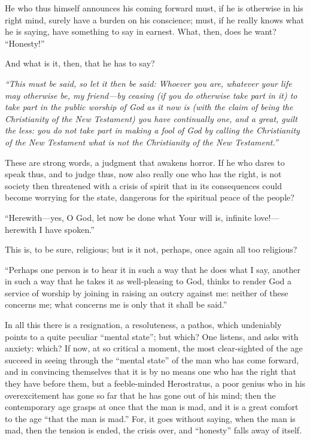 \documentclass[12pt,a4paper]{article}
\newcommand{\opage}[1]{\marginnote{\footnotesize\textit{[#1]}}}
\begin{document}
He who thus himself announces his coming forward must,
if he is otherwise in his right mind, surely have a burden
on his conscience; must, if he really knows
what he is saying, have something to say in earnest. What,
then, does he want? ``Honesty!''

And what is it, then, that he has to say?

\emph{``This must be said, so let it then be said:
Whoever you are, whatever your life may otherwise be, my
friend---by ceasing (if you do otherwise take part in it) to
take part in the public worship of God
as it now is (with the claim of
being the Christianity of the New Testament) you have
continually one, and a great, guilt the less: you
do not take part in making a fool of God by
calling the Christianity of the New Testament
what is not the Christianity of the New Testament.''}

These are strong words, a judgment that awakens horror. If
he who dares to speak thus, and to judge thus, now also
really one who has the right, is not society then threatened with a
crisis of spirit that in its consequences could become worrying for
the state, dangerous for the spiritual peace of the people?

``Herewith---yes, O God, let now be done what Your will is,
infinite love!---herewith I have spoken.''

This is, to be sure, religious; but is it not, perhaps,
once again all too religious?

``Perhaps one person is to hear it in such a way that he does what
I say, another in such a way that he takes it as
well-pleasing to God, thinks to render God a service of worship by
joining in raising an outcry against me: neither of these
concerns me; what concerns me is only that it shall be said.''

In all this there is a resignation, a resoluteness,
a pathos, which undeniably points to a quite peculiar
``mental state''; but which? One listens, and
\opage{3}
asks with anxiety: which? If now, at so
critical a moment, the most clear-sighted of the age succeed in seeing through
the ``mental state'' of the man who has come forward, and in convincing themselves
that it is by no means one who has the right that they have before them,
but a feeble-minded Herostratus, a poor genius who in
his overexcitement has gone so far that he has gone out of
his mind; then the contemporary age grasps at once that the man is mad, and
it is a great comfort to the age ``that the man is mad.'' For, it
goes without saying, when the man is mad, then the tension is
ended, the crisis over, and ``honesty'' falls away of
itself.
\end{document}
